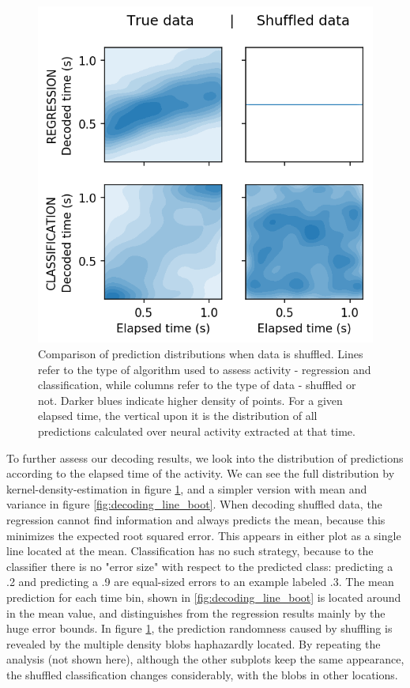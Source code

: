     \begin{figure}[ht]
        \centering
        \includegraphics{figures/decoding_kde_bootstrap_vs_true_31.png}
        \caption[Comparison of prediction distributions when data is shuffled]{Comparison of prediction distributions when data is shuffled. Lines refer to the type of algorithm used to assess activity - regression and classification, while columns refer to the type of data - shuffled or not. Darker blues indicate higher density of points. For a given elapsed time, the vertical upon it is the distribution of all predictions calculated over neural activity extracted at that time.}
        \label{fig:decoding_kde_boot}
    \end{figure}
    
    To further assess our decoding results, we look into the distribution of predictions according to the elapsed time of the activity. We can see the full distribution by kernel-density-estimation in figure \ref{fig:decoding_kde_boot}, and a simpler version with mean and variance in figure \ref{fig:decoding_line_boot}. When decoding shuffled data, the regression cannot find information and always predicts the mean, because this minimizes the expected root squared error. This appears in either plot as a single line located at the mean. Classification has no such strategy, because to the classifier there is no "error size" with respect to the predicted class: predicting a .2 and predicting a .9 are equal-sized errors to an example labeled .3. The mean prediction for each time bin, shown in \ref{fig:decoding_line_boot} is located around in the mean value, and distinguishes from the regression results mainly by the huge error bounds. In figure \ref{fig:decoding_kde_boot}, the prediction randomness caused by shuffling is revealed by the multiple density blobs haphazardly located. By repeating the analysis (not shown here), although the other subplots keep the same appearance, the shuffled classification changes considerably, with the blobs in other locations.
    
